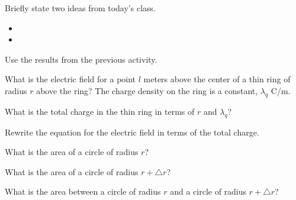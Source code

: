\postClass

\begin{problem}
\item Briefly state two ideas from today's class.
  \begin{itemize}
  \item
  \item
  \end{itemize}
\end{problem}


\begin{problem}
\item Use the results from the previous activity.
  \begin{subproblem}
  \item What is the electric field for a point $l$ meters above the center of a thin ring of radius $r$ above the ring?
    The charge density on the ring is a constant, $\lambda_q$ C/m.
    \vfill
  \item What is the total charge in the thin ring in terms of $r$ and $\lambda_q$?
    \vfill
  \item Rewrite the equation for the electric field in terms of the total charge.
    \vfill
  \item What is the area of a circle of radius $r$?
    \vfill
  \item What is the area of a circle of radius $r+\triangle r$?
      \vfill
  \item What is the area between a circle of radius $r$ and a circle of radius $r+\triangle r$?
      \vfill
  \end{subproblem}
\end{problem}



